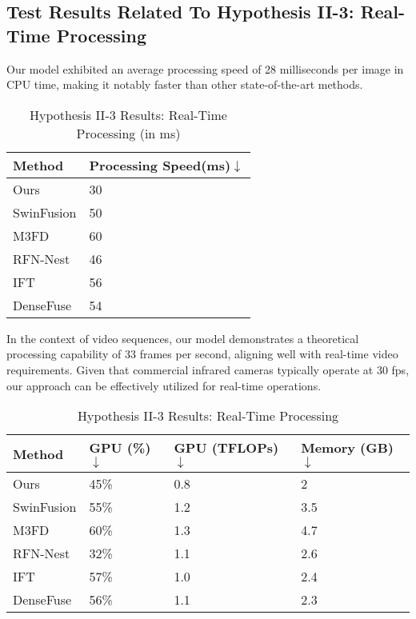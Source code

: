 \subsection{Test Results Related To Hypothesis II-3: Real-Time Processing} \label{subsec:met7res}

Our model exhibited an average processing speed of 28 milliseconds per image in CPU time, making it notably faster than other state-of-the-art methods.

\begin{table}[htbp]
    \centering
    \caption{Hypothesis II-3 Results: Real-Time Processing (in ms)}
    \label{tab:ch5:met7speed}
    \begin{tabular}{|l|l|}
        \hline
        \textbf{Method} & \textbf{Processing Speed\footnotemark (ms)$\downarrow$} \\
        \hline
        Ours & 30 \\ \hline
        SwinFusion\cite{ma2022swinfusion} & 50 \\\hline
        M3FD\cite{liu2022target} & 60 \\\hline
        RFN-Nest\cite{li2021rfn} & 46 \\\hline
        IFT\cite{vs2022image} & 56 \\\hline
        DenseFuse\cite{li2019infrared} & 54 \\
        \hline
    \end{tabular}
\end{table}


In the context of video sequences, our model demonstrates a theoretical processing capability of 33 frames per second, aligning well with real-time video requirements. Given that commercial infrared cameras typically operate at 30 fps, our approach can be effectively utilized for real-time operations.

\begin{table}[htbp]
    \centering
    \caption{Hypothesis II-3 Results: Real-Time Processing}
    \label{tab:ch5:met7resources}
    \begin{tabular}{|l|l|l|l|}
        \hline
        \textbf{Method} & \textbf{GPU (\%)$\downarrow$} & \textbf{GPU (TFLOPs)$\downarrow$} & \textbf{Memory (GB)$\downarrow$} \\
        \hline
        Ours & 45\% & 0.8 & 2 \\\hline
        SwinFusion\cite{ma2022swinfusion} & 55\% & 1.2 & 3.5 \\\hline
        M3FD\cite{liu2022target} & 60\% & 1.3 & 4.7 \\ \hline
        RFN-Nest\cite{li2021rfn} & 32\% & 1.1 & 2.6 \\\hline
        IFT\cite{vs2022image} & 57\% & 1.0 & 2.4 \\\hline
        DenseFuse\cite{li2019infrared} & 56\% & 1.1 & 2.3 \\
        \hline
    \end{tabular}
\end{table}

